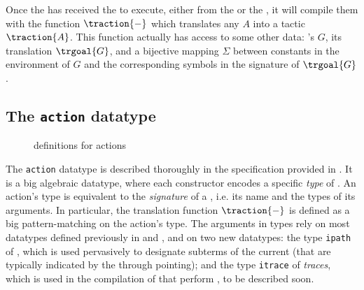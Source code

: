 Once the  has received the  to execute, either from the
 or the , it will compile them with the function
$\traction{-}$ which translates any  $A$ into a  tactic
$\traction{A}$. This function actually has access to some other data: 's
 $G$, its  translation $\trgoal{G}$, and a bijective mapping
$\Sigma$ between  constants in the environment of $G$ and the
corresponding  symbols in the  signature of
$\trgoal{G}$.

\subsection{The \texttt{action} datatype}

\begin{figure}
  
  \caption{ definitions for actions}
\end{figure}

The \texttt{action} datatype is described thoroughly in the  specification
provided in . It is a big algebraic datatype, where each
constructor encodes a specific \emph{type} of . An action's type is
equivalent to the \emph{signature} of a , i.e. its name and the types
of its arguments. In particular, the translation function $\traction{-}$ is
defined as a big pattern-matching on the action's type. The arguments in  types
rely on most datatypes defined previously in  and
, and on two new datatypes: the type \texttt{ipath} of
\emph{}, which is used pervasively to designate subterms of the current
 (that are typically indicated by the  through
pointing); and the type \texttt{itrace} of \emph{
traces}, which is used in the compilation of   that perform
, to be described soon.

